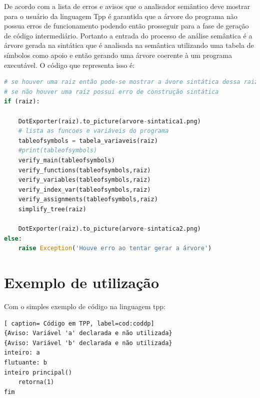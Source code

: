 \documentclass[12pt]{article}
\begin{document}
De acordo com a lista de erros e avisos que o analisador semântico deve mostrar para o usuário da linguagem Tpp é garantida que a árvore do programa não possua erros de funcionamento podendo então prosseguir para a fase de geração de código intermediário. 
Portanto a entrada do processo de análise semântica é a árvore gerada na sintática que é analisada na semântica utilizando uma tabela de símbolos como apoio e então gerando uma árvore coerente à um programa executável. 
O código que representa isso é: 
\begin{lstlisting}[language= Python, caption= Funções semânticas, label=cod:coddp] 
# se houver uma raiz então pode-se mostrar a ávore sintática dessa raiz 
# se não houver uma raíz possui erro de construção sintática  
if (raiz):    

	DotExporter(raiz).to_picture(arvore-sintatica1.png)   
	# lista as funcoes e variáveis do programa 
	tableofsymbols = tabela_variaveis(raiz)
	#print(tableofsymbols)  
	verify_main(tableofsymbols) 
	verify_functions(tableofsymbols,raiz) 
	verify_variables(tableofsymbols,raiz)   
	verify_index_var(tableofsymbols,raiz)
	verify_assignments(tableofsymbols,raiz) 
	simplify_tree(raiz) 
	 
	DotExporter(raiz).to_picture(arvore-sintatica2.png)    
else:
	raise Exception('Houve erro ao tentar gerar a árvore')  
\end{lstlisting} 

\section{Exemplo de utilização}  
Com o simples exemplo de código na linguagem tpp: 
\begin{lstlisting}[ caption= Código em TPP, label=cod:coddp] 
{Aviso: Variável 'a' declarada e não utilizada}
{Aviso: Variável 'b' declarada e não utilizada}
inteiro: a
flutuante: b
inteiro principal() 
	retorna(1) 
fim  
\end{lstlisting} 
\end{document}
